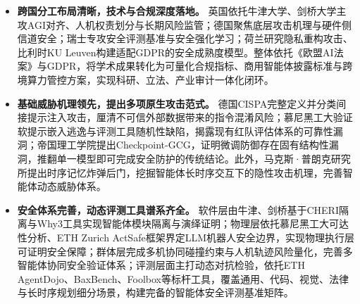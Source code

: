 \begin{itemize}[tabitem]
\item \textbf{跨国分工布局清晰，技术与合规深度落地。} 英国依托牛津大学、剑桥大学主攻AGI对齐、人机权责划分与长期风险监管\cite{wooldridgeHomepage2026,oxfordAIGI2026,cambridgeCFI2026}；德国聚焦底层攻击机理与硬件侧信道安全\cite{cispaFritz2026,tumSigl2026}；瑞士专攻安全评测基准与安全强化学习\cite{as2025actsafe}；荷兰研究隐私重构攻击\cite{tudelftErkin2026}、比利时KU Leuven构建适配GDPR的安全成熟度模型。整体依托《欧盟AI法案》与GDPR，将学术成果转化为可量化合规指标、商用智能体披露标准与跨境算力管控方案，实现科研、立法、产业审计一体化闭环\cite{mpiEUAIAct2026,citipDataProtectionByDesign2025}。

\item \textbf{基础威胁机理领先，提出多项原生攻击范式。} 德国CISPA完整定义并分类间接提示注入攻击，厘清不可信外部数据带来的指令混淆风险\cite{cispaAgentSafety2026}；慕尼黑工大验证软提示嵌入逃逸与评测工具随机性缺陷，揭露现有红队评估体系的可靠性漏洞\cite{tumCoinFlipSafety2026}；帝国理工学院提出Checkpoint-GCG，证明微调防御存在固有结构性漏洞，推翻单一模型即可完成安全防护的传统结论\cite{checkpointGCG2025}。此外，马克斯·普朗克研究所提出时序记忆炸弹后门，挖掘智能体长时序交互下的隐性攻击机理，完善智能体动态威胁体系\cite{mpiTimeBombs2026}。

\item \textbf{安全体系完善，动态评测工具谱系齐全。} 软件层由牛津、剑桥基于CHERI隔离与Why3工具实现智能体模块隔离与演绎证明\cite{cambridgeCHERI2026}；物理层依托慕尼黑工大可达性分析、ETH Zurich ActSafe框架界定LLM机器人安全边界，实现物理执行层可证明安全保障\cite{tumSafeLLMRobots2026,as2025actsafe}；群体层完成多机协同碰撞约束与人机轨迹风险量化，完善多智能体协同安全验证体系\cite{gao2025provablySafe}；评测层面主打动态对抗检验，依托ETH AgentDojo、BaxBench、Foolbox等标杆工具，覆盖通用、代码、视觉、法律与长时序规划细分场景，构建完备的智能体安全评测基准矩阵\cite{baxbench2026,mpiLegalAgentBenchmark2026}。
\end{itemize}


\begingroup


